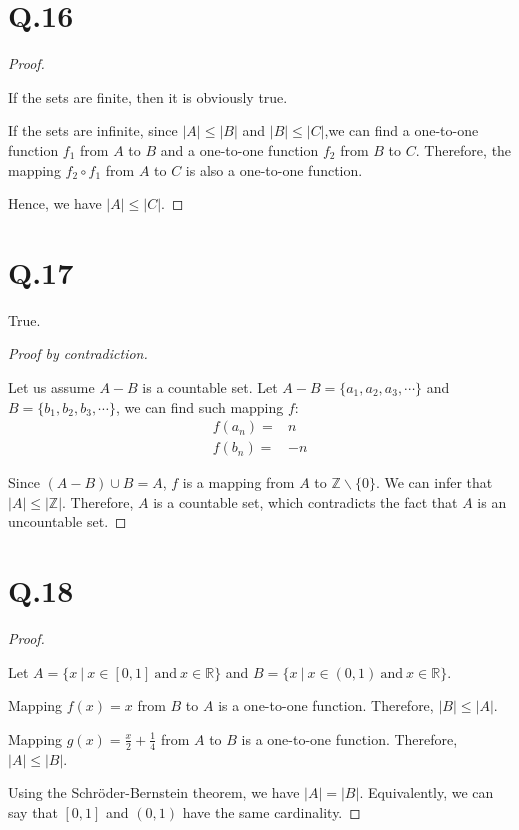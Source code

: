 \documentclass[a4paper,12pt]{article}
\begin{document}
\section*{Q.16}
\begin{proof}
$ $

If the sets are finite, then it is obviously true.

If the sets are infinite, since $|A| \leq |B|$ and $|B| \leq |C|$,we can find a one-to-one function $f_1$ from $A$ to $B$ and a one-to-one function $f_2$ from $B$ to $C$.
Therefore, the mapping $f_2 \circ f_1$ from $A$ to $C$ is also a one-to-one function.

Hence, we have $|A| \leq |C|$.
\end{proof}

\section*{Q.17}

True.

\begin{proof}[Proof by contradiction]
$ $

Let us assume $A - B$ is a countable set.
Let $A - B = \{a_1,a_2,a_3,\cdots\}$ and $B = \{b_1,b_2,b_3,\cdots\}$, we can find such mapping $f$:
\begin{align*}
	f(a_n) =& n\\
	f(b_n) =& -n
\end{align*}

Since $(A - B) \cup B = A$, $f$ is a mapping from $A$ to $\mathbb{Z} \backslash \{0\}$.
We can infer that $|A| \leq |\mathbb{Z}|$.
Therefore, $A$ is a countable set, which contradicts the fact that $A$ is an uncountable set.
\end{proof}

\section*{Q.18}
\begin{proof}
$ $

Let $A = \{x\ |\ x \in [0,1]\ \text{and}\ x\in \mathbb{R}\}$ and $B = \{x\ |\ x \in (0,1)\ \text{and}\ x\in \mathbb{R}\}$.

Mapping $f(x) = x$ from $B$ to $A$ is a one-to-one function.
Therefore, $|B| \leq |A|$.

Mapping $g(x) = \frac{x}{2} + \frac{1}{4}$ from $A$ to $B$ is a one-to-one function.
Therefore, $|A| \leq |B|$.

Using the Schröder-Bernstein theorem, we have $|A| = |B|$.
Equivalently, we can say that $[0,1]$ and $(0,1)$ have the same cardinality.
\end{proof}
\end{document}
